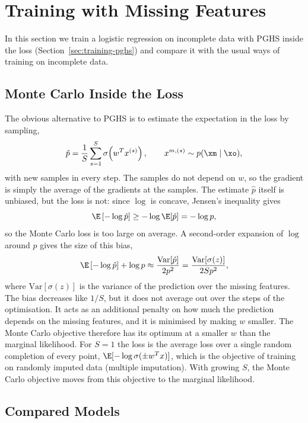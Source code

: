 \section{Training with Missing Features}
\label{sec:training}

In this section we train a logistic regression on incomplete data with PGHS
inside the loss (Section~\ref{sec:training-pghs}) and compare it with the usual
ways of training on incomplete data.

\subsection{Monte Carlo Inside the Loss}
\label{subsec:training-mc}

The obvious alternative to PGHS is to estimate the expectation in the loss by sampling,
\[
  \hat p = \frac{1}{S} \sum_{s=1}^{S} \sigma\!\left(w^T x^{(s)}\right),
  \qquad x^{m,(s)} \sim p(\xm \mid \xo),
\]
with new samples in every step. The samples do not depend on $w$, so the
gradient is simply the average of the gradients at the samples. The estimate
$\hat p$ itself is unbiased, but the loss is not: since $\log$ is concave,
Jensen's inequality gives
\[
  \E\left[ -\log \hat p \right] \geq -\log \E[\hat p] = -\log p ,
\]
so the Monte Carlo loss is too large on average. A second-order expansion of
$\log$ around $p$ gives the size of this bias,
\[
  \E\left[ -\log \hat p \right] + \log p \approx
  \frac{\mathrm{Var}[\hat p]}{2 p^2} = \frac{\mathrm{Var}[\sigma(z)]}{2 S p^2},
\]
where $\mathrm{Var}[\sigma(z)]$ is the variance of the prediction over the missing
features. The bias decreases like $1/S$, but it does not average out over the
steps of the optimisation. It acts as an additional penalty on how much the
prediction depends on the missing features, and it is minimised by making $w$
smaller. The Monte Carlo objective therefore has its optimum at a smaller $w$
than the marginal likelihood. For $S = 1$ the loss is the average loss over a
single random completion of every point, $\E[-\log \sigma(\pm w^T x)]$, which is
the objective of training on randomly imputed data (multiple imputation). With
growing $S$, the Monte Carlo objective moves from this objective to the
marginal likelihood.

\subsection{Compared Models}
\label{subsec:training-models}

